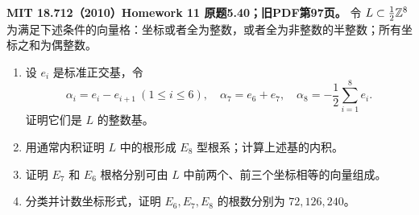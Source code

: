 \begin{exercise}\label{hw:5.40}
\textbf{MIT 18.712（2010）Homework 11 原题5.40；旧PDF第97页。}
令 $L\subset\tfrac12\mathbb Z^8$ 为满足下述条件的向量格：坐标或者全为整数，或者全为非整数的半整数；所有坐标之和为偶整数。
\begin{enumerate}[label=(\alph*)]
\item 设 $e_i$ 是标准正交基，令
\[
 \alpha_i=e_i-e_{i+1}\ (1\le i\le6),\quad
 \alpha_7=e_6+e_7,\quad
 \alpha_8=-\frac12\sum_{i=1}^8e_i.
\]
证明它们是 $L$ 的整数基。
\item 用通常内积证明 $L$ 中的根形成 $E_8$ 型根系；计算上述基的内积。
\item 证明 $E_7$ 和 $E_6$ 根格分别可由 $L$ 中前两个、前三个坐标相等的向量组成。
\item 分类并计数坐标形式，证明 $E_6,E_7,E_8$ 的根数分别为 $72,126,240$。
\end{enumerate}
\end{exercise}
